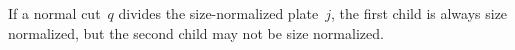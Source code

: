 \documentclass[smallextended]{svjour3}       %
\begin{document}
\begin{remark}
If a normal cut~\(q\) divides the size-normalized plate~\(j\), the first child is always size normalized, but the second child may not be size normalized.
\end{remark}


% 
% 







% 

\end{document}
